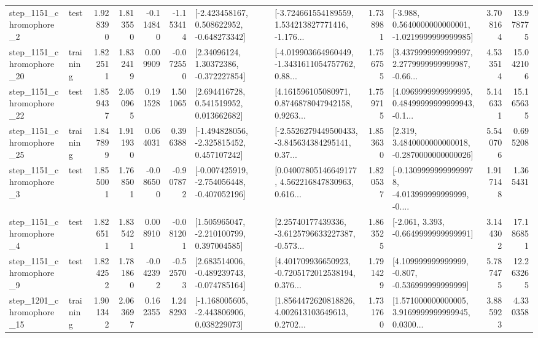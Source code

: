 \begin{tabular}{llrrrrllrlrr}
  step\_1151\_chromophore\_2 &      test &      1.928390 &    1.813550 &     -0.114840 & -1.153414 &   [-2.423458167, 0.508622952, -0.648273342] &  [-3.724661554189559, 1.534213827771416, -1.176... &       1.738981 &  [-3.988, 0.5640000000000001, -1.0219999999999985] &            3.708164 &         13.978775 \\
 step\_1151\_chromophore\_20 &  training &      1.822511 &    1.832419 &      0.009909 & -0.072550 &      [2.34096124, 1.30372386, -0.372227854] &  [-4.019903664960449, -1.3431611054757762, 0.88... &       1.756755 &  [3.4379999999999997, 2.2779999999999987, -0.66... &            4.533514 &         15.042106 \\
 step\_1151\_chromophore\_22 &      test &      1.859437 &    2.050965 &      0.191528 &  1.501065 &     [2.694416728, 0.541519952, 0.013662682] &  [4.161596105080971, 0.8746878047942158, 0.9263... &       1.759715 &  [4.0969999999999995, 0.48499999999999943, -0.1... &            5.146331 &         15.165635 \\
 step\_1151\_chromophore\_25 &  training &      1.847899 &    1.911930 &      0.064031 &  0.396388 &   [-1.494828056, -2.325815452, 0.457107242] &  [-2.5526279449500433, -3.845634384295141, 0.37... &       1.853630 &   [2.319, 3.4840000000000018, -0.2870000000000026] &            5.540706 &          0.695208 \\
  step\_1151\_chromophore\_3 &      test &      1.855001 &    1.768501 &     -0.086500 & -0.907872 &  [-0.007425919, -2.754056448, -0.407052196] &  [0.04007805146649177, 4.562216847830963, 0.616... &       1.820537 &  [-0.13099999999999978, -4.013999999999999, -0.... &            1.917148 &          1.365431 \\
  step\_1151\_chromophore\_4 &      test &      1.826511 &    1.835421 &      0.008910 & -0.081201 &    [1.505965047, -2.210100799, 0.397004585] &  [2.25740177439336, -3.6125796633227387, -0.573... &       1.863525 &               [-2.061, 3.393, -0.6649999999999991] &            3.144302 &         17.186851 \\
  step\_1151\_chromophore\_9 &      test &      1.824252 &    1.781860 &     -0.042392 & -0.525703 &   [2.683514006, -0.489239743, -0.074785164] &  [4.401709936650923, -0.7205172012538194, 0.376... &       1.791429 &    [4.109999999999999, -0.807, -0.536999999999999] &            5.787475 &         12.263265 \\
 step\_1201\_chromophore\_15 &  training &      1.901342 &    2.063697 &      0.162355 &  1.248293 &   [-1.168005605, -2.443806906, 0.038229073] &  [1.8564472620818826, 4.002613103649613, 0.2702... &       1.731760 &  [1.571000000000005, 3.9169999999999945, 0.0300... &            3.885923 &          4.330358 \\

\end{tabular}
